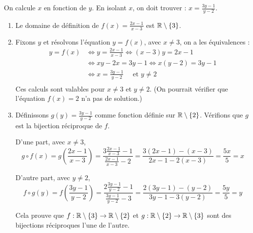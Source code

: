\documentclass[11pt,class=report,crop=false]{standalone}
\begin{document}
\indication
On calcule $x$ en fonction de $y$. En isolant $x$, on doit trouver : $x= \frac{3y-1}{y-2}$.
\finindication

\correction
\sauteligne
\begin{enumerate}
    \item Le domaine de définition de $f(x) = \frac{2x-1}{x-3}$ est $\mathbb{R} \setminus \{ 3 \}$.
    
    \item Fixons $y$ et résolvons l'équation $y = f(x)$, avec $x\neq3$, on a les équivalences :   
    \begin{align*}
        y = f(x)  
        & \iff y = \frac{2x-1}{x-3} \iff (x-3)y = 2x-1 \\
        & \iff xy -2x = 3y-1 \iff x(y-2) = 3y-1 \\
        & \iff x =  \frac{3y-1}{y-2} \quad \text{ et } y \neq 2 \\
     \end{align*} 
    Ces calculs sont valables pour $x \neq 3$ et $y \neq 2$.
    (On pourrait vérifier que l'équation $f(x) = 2$ n'a pas de solution.)
    
    
    \item 
    Définissons $g(y) =  \frac{3y-1}{y-2}$ comme fonction définie sur $\mathbb{R} \setminus \{ 2 \}$.
    Vérifions que $g$ est la bijection réciproque de $f$.
    
    D'une part, avec $x \neq 3$,  
    $$g \circ f(x) 
    = g \left( \frac{2x-1}{x-3} \right) 
    = \frac{3\frac{2x-1}{x-3}-1}{\frac{2x-1}{x-3}-2}
    = \frac{3(2x-1) - (x-3)}{2x-1 - 2(x-3)}
    = \frac{5x}{5}
    = x
    $$
    
    D'autre part, avec $y \neq 2$,
    $$f \circ g(y) 
    = f \left( \frac{3y-1}{y-2} \right) 
    = \frac{2\frac{3y-1}{y-2}-1}{\frac{3y-1}{y-2}-3} 
    = \frac{2(3y-1)-(y-2)}{3y-1 -3(y-2)}     
    = \frac{5y}{5}
    = y
    $$    
    
    Cela prouve que $f : \mathbb{R} \setminus \{ 3 \} \to \mathbb{R} \setminus \{ 2 \}$ et
    $g : \mathbb{R} \setminus \{ 2 \} \to \mathbb{R} \setminus \{ 3 \}$
    sont des bijections réciproques l'une de l'autre.
\end{enumerate} 
\fincorrection
\finexercice
\end{document}
